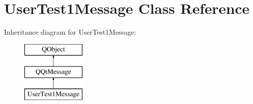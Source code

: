 \hypertarget{class_user_test1_message}{}\section{User\+Test1\+Message Class Reference}
\label{class_user_test1_message}
Inheritance diagram for User\+Test1\+Message\+:\begin{figure}[H]
\begin{center}
\leavevmode
\includegraphics[height=3.000000cm]{class_user_test1_message}
\end{center}
\end{figure}
